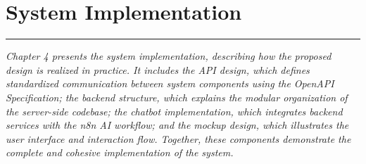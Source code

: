 \chapter {System Implementation}
\noindent
\rule{\textwidth}{0.4pt}

\begin{center}
\begin{minipage}{0.8\textwidth}
\textit{Chapter 4 presents the system implementation, describing how the proposed design is realized in practice. It includes the API design, which defines standardized communication between system components using the OpenAPI Specification; the backend structure, which explains the modular organization of the server-side codebase; the chatbot implementation, which integrates backend services with the n8n AI workflow; and the mockup design, which illustrates the user interface and interaction flow. Together, these components demonstrate the complete and cohesive implementation of the system.}
\end{minipage}

\end{center}





% 